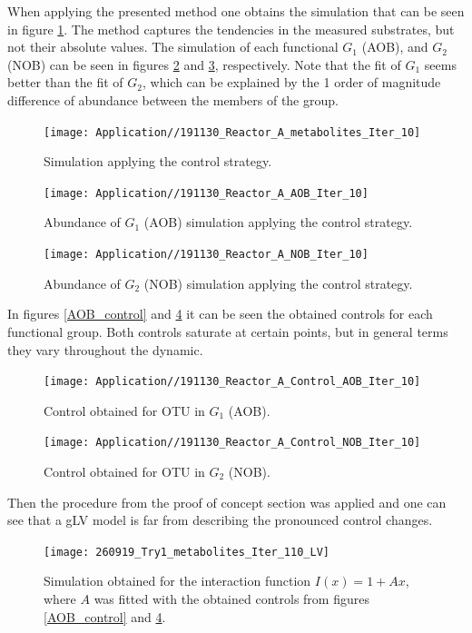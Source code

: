 \documentclass[3p,times]{elsarticle}
\begin{document}
When applying the presented method one obtains the simulation that can be seen in figure \ref{ControlSimulation}. The method captures the tendencies in the measured substrates, but not their absolute values. The simulation of each functional $G_1$ (AOB), and $G_2$ (NOB) can be seen in figures \ref{AOBSimulation} and \ref{NOB Simulation}, respectively. Note that the fit of $G_1$ seems better than the fit of $G_2$, which can be explained by the 1 order of magnitude difference of abundance between the members of the group.


\begin{figure}[h]
	\centering
	\texttt{[image: Application//191130\_Reactor\_A\_metabolites\_Iter\_10]}
	\caption{Simulation applying the control strategy.}
	\label{ControlSimulation}
\end{figure}


\begin{figure}[h]
	\centering
	\texttt{[image: Application//191130\_Reactor\_A\_AOB\_Iter\_10]}
	\caption{Abundance of $G_1$ (AOB) simulation applying the control strategy.}
	\label{AOBSimulation}
\end{figure}

\begin{figure}[h]
	\centering
	\texttt{[image: Application//191130\_Reactor\_A\_NOB\_Iter\_10]}
	\caption{Abundance of $G_2$ (NOB) simulation applying the control strategy.}
	\label{NOB Simulation}
\end{figure}


In figures \ref{AOB_control} and \ref{NOB_control} it can be seen the obtained controls for each functional group. Both controls saturate at certain points, but in general terms they vary throughout the dynamic. 

\begin{figure}[h]
	\centering
	\texttt{[image: Application//191130\_Reactor\_A\_Control\_AOB\_Iter\_10]}
	\caption{Control obtained for OTU in $G_1$ (AOB).}
	\label{AOB_control}
	\texttt{[image: Application//191130\_Reactor\_A\_Control\_NOB\_Iter\_10]}
	\caption{Control obtained for OTU in $G_2$ (NOB).}
	\label{NOB_control}
\end{figure}

Then the procedure from the proof of concept section was applied and one can see that a gLV model is far from describing the pronounced control changes.

\begin{figure}[h]
	\centering
	\texttt{[image: 260919\_Try1\_metabolites\_Iter\_110\_LV]}
	\caption{Simulation obtained for the interaction function $I(x) = 1 + Ax$, where $A$ was fitted with the obtained controls from figures \ref{AOB_control} and \ref{NOB_control}.}
	\label{LV_fit}
\end{figure}
\clearpage
\end{document}
